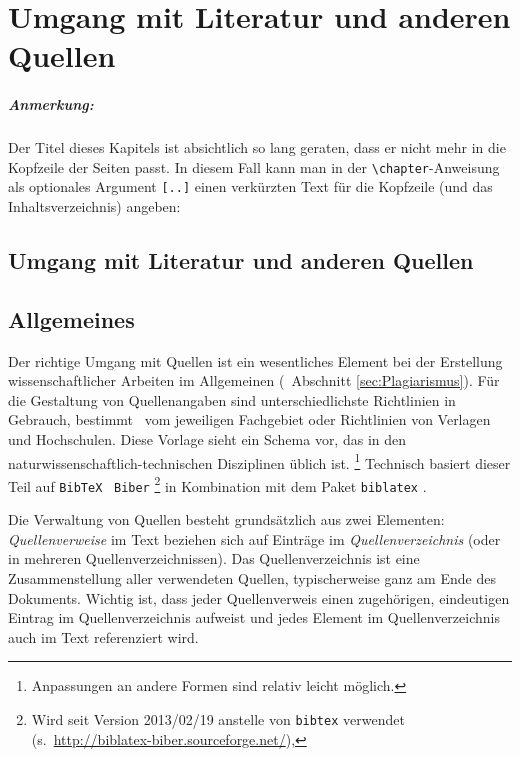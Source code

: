 \chapter[Umgang mit Literatur]{Umgang mit Literatur und anderen Quellen}
\label{cha:Literatur}

\paragraph{Anmerkung:}
Der Titel dieses Kapitels ist absichtlich so
lang geraten, dass er nicht mehr in die Kopfzeile der Seiten passt. 
In diesem Fall kann man in der \verb!\chapter!-Anweisung 
als optionales Argument \verb![..]! einen verkürzten Text für die
Kopfzeile (und das Inhaltsverzeichnis) angeben:
%
\begin{LaTeXCode}[numbers=none]
\chapter[Umgang mit Literatur]{Umgang mit Literatur und anderen Quellen}
\end{LaTeXCode}

\section{Allgemeines}

Der richtige Umgang mit Quellen ist ein wesentliches Element bei der Erstellung
wissenschaftlicher Arbeiten im Allgemeinen (\sa\ Abschnitt \ref{sec:Plagiarismus}).
Für die Gestaltung von Quellenangaben sind unterschiedlichste Richtlinien in
Gebrauch, bestimmt \ua\ vom jeweiligen Fachgebiet oder Richtlinien von Verlagen und Hochschulen.
Diese Vorlage sieht ein Schema vor, das in den natur\-wissen\-schaftlich-technischen 
Disziplinen üblich ist.%
\footnote{Anpassungen an andere Formen sind relativ leicht möglich.}
Technisch basiert dieser Teil auf \texttt{BibTeX} \cite{Patashnik88}
\bzw\ \texttt{Biber}%
\footnote{Wird seit Version 2013/02/19 anstelle von \texttt{bibtex} verwendet 
	(s.\ \url{http://biblatex-biber.sourceforge.net/}),}
in Kombination mit dem Paket \texttt{biblatex} \cite{Lehman2011}.


Die Verwaltung von Quellen besteht grundsätzlich aus zwei Elementen: 
\emph{Quellenverweise} im Text beziehen sich auf Einträge im \emph{Quellenverzeichnis}
(oder in mehreren Quellenverzeichnissen).
Das Quellenverzeichnis ist eine
Zusammenstellung aller verwendeten Quellen, typischerweise ganz am Ende des Dokuments.
Wichtig ist, dass jeder Quellenverweis einen zugehörigen, eindeutigen
Eintrag im Quellenverzeichnis aufweist und jedes Element im Quellenverzeichnis auch
im Text referenziert wird.



